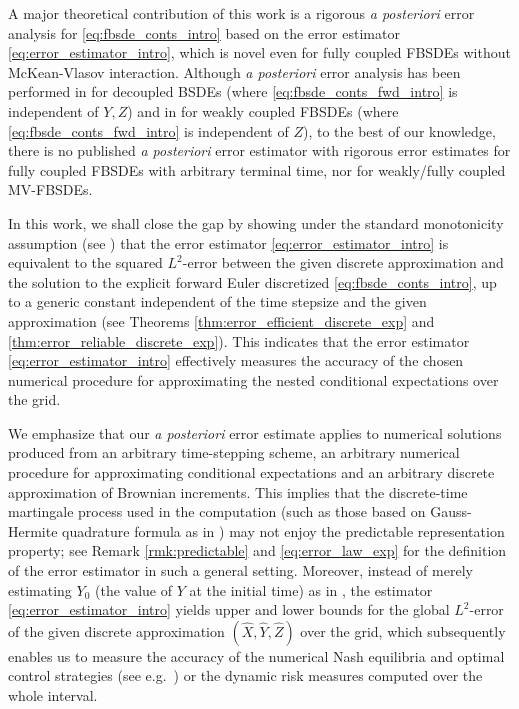 \documentclass[11pt]{article}
\numberwithin{equation}{section}
\theoremstyle{definition}
\theoremstyle{remark}
\begin{document}
A major theoretical contribution of this work is a rigorous  \textit{a posteriori} error analysis 
for \eqref{eq:fbsde_conts_intro} based on the error estimator \eqref{eq:error_estimator_intro},
which is novel even  for fully coupled FBSDEs without McKean-Vlasov interaction.
Although \textit{a posteriori} error analysis 
has  been performed in \cite{bender2013,bender2017}
for decoupled BSDEs 
(where  \eqref{eq:fbsde_conts_fwd_intro}
is independent of  $Y,Z$)
and  in \cite{han2018}
for weakly coupled FBSDEs 
(where  \eqref{eq:fbsde_conts_fwd_intro}
is independent of $Z$),
to the best of our knowledge,
 there is no published 
 \textit{a posteriori} error estimator
 with rigorous error estimates 
 for  fully coupled FBSDEs
 with  arbitrary terminal time,
 nor for weakly/fully coupled MV-FBSDEs.
 
In this work, we shall close the gap by showing under the standard monotonicity assumption (see \cite{peng1999,bensoussan2015}) that
the error estimator \eqref{eq:error_estimator_intro} is equivalent to
 the  squared $L^2$-error between the given discrete approximation
 and the solution to the explicit forward Euler 
discretized  \eqref{eq:fbsde_conts_intro},
up to a generic constant independent of the time stepsize and the given approximation
(see Theorems \ref{thm:error_efficient_discrete_exp} and \ref{thm:error_reliable_discrete_exp}).
This indicates that the error estimator \eqref{eq:error_estimator_intro} effectively measures 
the accuracy of the chosen numerical procedure for approximating 
the nested conditional expectations over the grid.


 We emphasize that
our \textit{a posteriori} error estimate  applies to 
numerical solutions 
produced from an arbitrary time-stepping scheme,
an arbitrary numerical procedure for approximating conditional expectations
and an arbitrary discrete
approximation of  Brownian increments.
This implies that 
the   discrete-time martingale process 
used  in the computation
(such as those  based on Gauss-Hermite quadrature formula
as  in \cite{picarelli2020})
may not enjoy the predictable representation property;
see Remark \ref{rmk:predictable} and \eqref{eq:error_law_exp}
for the definition of the error estimator in such a general setting.
Moreover,
instead of 
merely estimating $Y_0$ (the value of $Y$ at the initial time)
 as in \cite{bender2017}, 
 the estimator 
\eqref{eq:error_estimator_intro}  
yields upper and lower bounds for the global $L^2$-error of the given discrete approximation
 $(\hat{X},\hat{Y},\hat{Z})$
over the grid,
which subsequently enables us to measure
 the accuracy of the  numerical Nash equilibria and optimal control strategies
 (see e.g.~\cite{andrea2019,carmona2019,chassagneux2019,germain2019})
 or the dynamic risk measures  \cite{gnoatto2020} computed over the whole interval.
\end{document}
